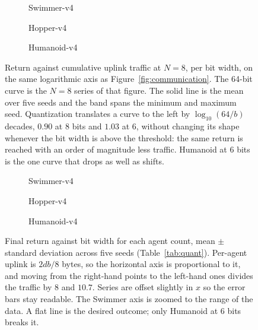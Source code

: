 \begin{figure}[t]
  \centering
  \begin{subfigure}[b]{0.49\textwidth}
    
    \caption{Swimmer-v4}
  \end{subfigure}
  \hfill
  \begin{subfigure}[b]{0.49\textwidth}
    
    \caption{Hopper-v4}
  \end{subfigure}

  \vspace{0.6em}
  \begin{subfigure}[b]{0.49\textwidth}
    
    \caption{Humanoid-v4}
  \end{subfigure}
  \caption{Return against cumulative uplink traffic at $N = 8$, per bit width,
  on the same logarithmic axis as Figure~\ref{fig:communication}. The 64-bit
  curve is the $N = 8$ series of that figure. The solid line is the mean over
  five seeds and the band spans the minimum and maximum seed. Quantization
  translates a curve to the left by $\log_{10}(64/b)$ decades, $0.90$ at 8 bits
  and $1.03$ at 6, without changing its shape whenever the bit width is above
  the threshold: the same return is reached with an order of magnitude less
  traffic. Humanoid at 6 bits is the one curve that drops as well as shifts.}
  \label{fig:quantcomm}
\end{figure}

\begin{figure}[t]
  \centering
  \begin{subfigure}[b]{0.49\textwidth}
    
    \caption{Swimmer-v4}
  \end{subfigure}
  \hfill
  \begin{subfigure}[b]{0.49\textwidth}
    
    \caption{Hopper-v4}
  \end{subfigure}

  \vspace{0.6em}
  \begin{subfigure}[b]{0.49\textwidth}
    
    \caption{Humanoid-v4}
  \end{subfigure}
  \caption{Final return against bit width for each agent count, mean $\pm$
  standard deviation across five seeds (Table~\ref{tab:quant}). Per-agent uplink
  is $2db/8$ bytes, so the horizontal axis is proportional to it, and moving
  from the right-hand points to the left-hand ones divides the traffic by $8$
  and $10.7$. Series are offset slightly in $x$ so the error bars stay
  readable. The Swimmer axis is zoomed to the range of the data. A flat line
  is the desired outcome; only Humanoid at 6 bits breaks it.}
  \label{fig:quanttradeoff}
\end{figure}


